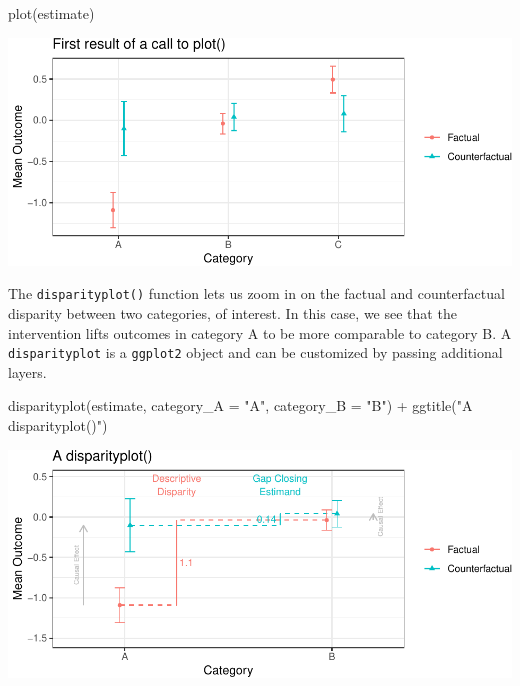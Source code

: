 \documentclass[
]{article}
\newenvironment{Shaded}{\begin{snugshade}}{\end{snugshade}}
\newcommand{\AttributeTok}[1]{\textcolor[rgb]{0.77,0.63,0.00}{#1}}
\newcommand{\FunctionTok}[1]{\textcolor[rgb]{0.00,0.00,0.00}{#1}}
\newcommand{\NormalTok}[1]{#1}
\newcommand{\SpecialCharTok}[1]{\textcolor[rgb]{0.00,0.00,0.00}{#1}}
\newcommand{\StringTok}[1]{\textcolor[rgb]{0.31,0.60,0.02}{#1}}
\begin{document}
\begin{Shaded}
\begin{Highlighting}[]
\FunctionTok{plot}\NormalTok{(estimate)}
\end{Highlighting}
\end{Shaded}

\includegraphics{github_doc_files/figure-latex/unnamed-chunk-12-1.pdf}

The \texttt{disparityplot()} function lets us zoom in on the factual and counterfactual disparity between two categories, of interest. In this case, we see that the intervention lifts outcomes in category A to be more comparable to category B. A \texttt{disparityplot} is a \texttt{ggplot2} object and can be customized by passing additional layers.

\begin{Shaded}
\begin{Highlighting}[]
\FunctionTok{disparityplot}\NormalTok{(estimate, }\AttributeTok{category\_A =} \StringTok{"A"}\NormalTok{, }\AttributeTok{category\_B =} \StringTok{"B"}\NormalTok{) }\SpecialCharTok{+}
  \FunctionTok{ggtitle}\NormalTok{(}\StringTok{"A disparityplot()"}\NormalTok{)}
\end{Highlighting}
\end{Shaded}

\includegraphics{github_doc_files/figure-latex/unnamed-chunk-13-1.pdf}
\end{document}
